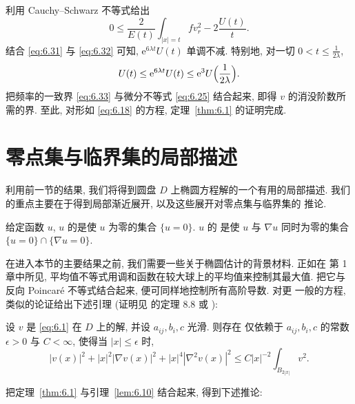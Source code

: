 利用 Cauchy--Schwarz 不等式给出
\begin{equation}
0\leq\frac{2}{E(t)}\int_{|x|=t}fv_r^2-2\frac{U(t)}{t}.
\label{eq:6.32}
\end{equation}
结合 \eqref{eq:6.31} 与 \eqref{eq:6.32} 可知, $\mathrm{e}^{6\lambda t}U(t)$
单调不减. 特别地, 对一切 $0<t\leq\frac{1}{2\lambda}$,
\begin{equation}
U(t)\leq\mathrm{e}^{6\lambda t}U(t)\leq\mathrm{e}^{3}
U\Bigl(\frac{1}{2\lambda}\Bigr).
\label{eq:6.33}
\end{equation}
把频率的一致界 \eqref{eq:6.33} 与微分不等式 \eqref{eq:6.25} 结合起来,
即得 $v$ 的消没阶数所需的界. 至此, 对形如 \eqref{eq:6.18} 的方程,
定理~\ref{thm:6.1} 的证明完成.

\section{零点集与临界集的局部描述}
\label{sec:6.2}

利用前一节的结果, 我们将得到圆盘 $D$ 上椭圆方程解的一个有用的局部描述.
我们的重点主要在于得到局部渐近展开, 以及这些展开对零点集与临界集的
推论.

\begin{definition}[零点集与临界集]
\label{def:6.9}
给定函数 $u$, $u$ 的是使 $u$ 为零的集合 $\{u=0\}$. $u$ 的
是使 $u$ 与 $\nabla u$ 同时为零的集合
$\{u=0\}\cap\{\nabla u=0\}$.
\end{definition}

在进入本节的主要结果之前, 我们需要一些关于椭圆估计的背景材料. 正如在
第 1 章中所见, 平均值不等式用调和函数在较大球上的平均值来控制其最大值.
把它与反向 Poincar\'e 不等式结合起来, 便可同样地控制所有高阶导数. 对更
一般的方程, 类似的论证给出下述引理 (证明见 \cite{GiTr} 的定理 8.8 或
\cite{HaLi}):

\begin{lemma}
\label{lem:6.10}
设 $v$ 是 \eqref{eq:6.1} 在 $D$ 上的解, 并设 $a_{ij},b_i,c$ 光滑. 则存在
仅依赖于 $a_{ij},b_i,c$ 的常数 $\epsilon>0$ 与 $C<\infty$, 使得当
$|x|\leq\epsilon$ 时,
\begin{equation}
|v(x)|^2+|x|^2|\nabla v(x)|^2+|x|^4|\nabla^2v(x)|^2
\leq C|x|^{-2}\int_{B_{2|x|}}v^2.
\label{eq:6.34}
\end{equation}
\end{lemma}

把定理~\ref{thm:6.1} 与引理~\ref{lem:6.10} 结合起来, 得到下述推论:

